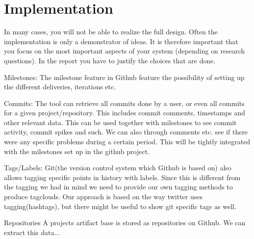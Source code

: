 \chapter{Implementation}
In many cases, you will not be able to realize the full design. Often the implementation is only a demonstrator of ideas. 
It is therefore important that you focus on the most important aspects of your system (depending on research questions). 
In the report you have to justify the choices that are done.

Milestones:
The milestone feature in Github feature the possibility of setting up the different deliveries, iterations etc.

Commits:
The tool can retrieve all commits done by a user, or even all commits for a given project/repository. This includes commit comments, timestamps and other relevant data. This can be used together with milestones to see commit activity, commit spikes and such. We can also through comments etc. see if there were any specific problems during a certain period. This will be tightly integrated with the milestones set up in the github project. 

Tags/Labels:
Git(the version control system which Github is based on) also allows tagging specific points in history with labels. Since this is different from the tagging we had in mind we need to provide our own tagging methods to produce tagclouds. Our approach is based on the way twitter uses tagging(hashtags), but there might be useful to show git specific tags as well.

Repositories
A projects artifact base is stored as repositories on Github. We can extract this data...

